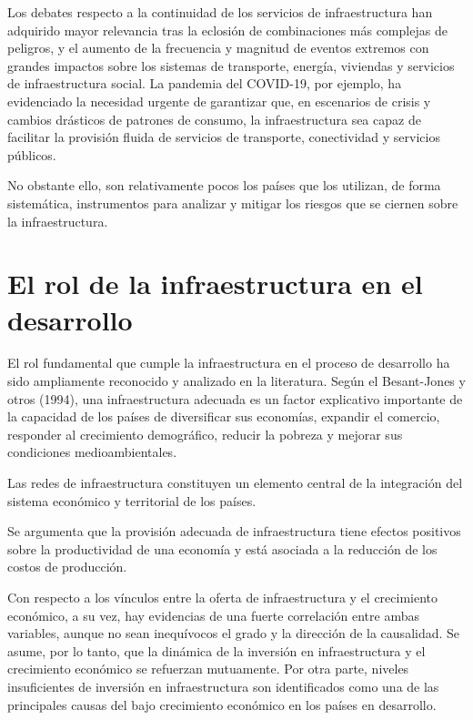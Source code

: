 \documentclass{article}
\begin{document}
Los debates respecto a la continuidad de los servicios de
infraestructura han adquirido mayor relevancia tras la eclosión de
combinaciones más complejas de peligros, y el aumento de la frecuencia y
magnitud de eventos extremos con grandes impactos sobre los sistemas de
transporte, energía, viviendas y servicios de infraestructura social. La
pandemia del COVID-19, por ejemplo, ha evidenciado la necesidad urgente
de garantizar que, en escenarios de crisis y cambios drásticos de
patrones de consumo, la infraestructura sea capaz de facilitar la
provisión fluida de servicios de transporte, conectividad y servicios
públicos.

No obstante ello, son relativamente pocos los países que los utilizan,
de forma sistemática, instrumentos para analizar y mitigar los riesgos
que se ciernen sobre la infraestructura.

\hypertarget{el-rol-de-la-infraestructura-en-el-desarrollo}{%
\section{El rol de la infraestructura en el
desarrollo}\label{el-rol-de-la-infraestructura-en-el-desarrollo}}

El rol fundamental que cumple la infraestructura en el proceso de
desarrollo ha sido ampliamente reconocido y analizado en la literatura.
Según el Besant-Jones y otros (1994), una infraestructura adecuada es un
factor explicativo importante de la capacidad de los países de
diversificar sus economías, expandir el comercio, responder al
crecimiento demográfico, reducir la pobreza y mejorar sus condiciones
medioambientales.

Las redes de infraestructura constituyen un elemento central de la
integración del sistema económico y territorial de los países.

Se argumenta que la provisión adecuada de infraestructura tiene efectos
positivos sobre la productividad de una economía y está asociada a la
reducción de los costos de producción.

Con respecto a los vínculos entre la oferta de infraestructura y el
crecimiento económico, a su vez, hay evidencias de una fuerte
correlación entre ambas variables, aunque no sean inequívocos el grado y
la dirección de la causalidad. Se asume, por lo tanto, que la dinámica
de la inversión en infraestructura y el crecimiento económico se
refuerzan mutuamente. Por otra parte, niveles insuficientes de inversión
en infraestructura son identificados como una de las principales causas
del bajo crecimiento económico en los países en desarrollo.
\end{document}
